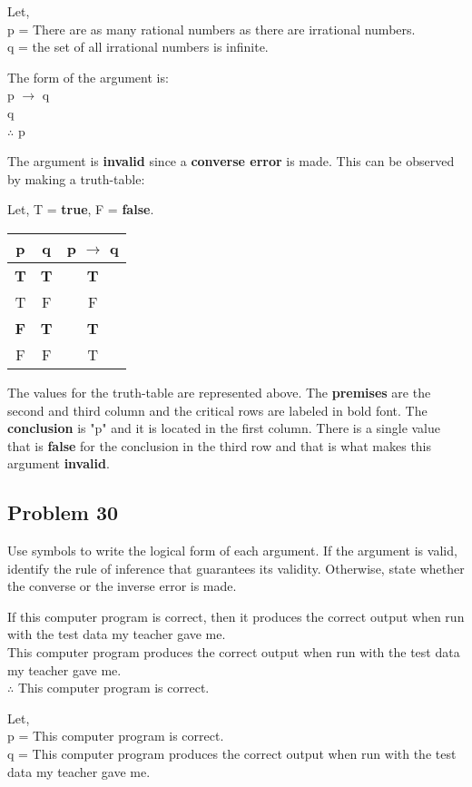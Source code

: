 \documentclass{article}
\begin{document}
Let, 
\\p = There are as many rational numbers as there are irrational numbers.
\\q = the set of all irrational numbers is infinite.

The form of the argument is:
\\ p $\rightarrow$ q
\\ q
\\ $\therefore$ p

The argument is \textbf{invalid} since a \textbf{converse error} is made. This can be observed by making a truth-table:

Let, T = \textbf{true}, F = \textbf{false}.
\begin{center}
	\begin{tabular}{ |c|c|c| } 
		\hline
		p & q & p $\rightarrow$ q \\ 
		\hline
		\textbf{T} & \textbf{T} & \textbf{T} \\ 
		T & F & F \\ 
		\textbf{F} & \textbf{T} & \textbf{T} \\ 
		F & F & T \\ 
		\hline
	\end{tabular}
\end{center}

The values for the truth-table are represented above. The \textbf{premises} are the second and third column and the critical rows are labeled in bold font. The \textbf{conclusion} is "p" and it is located in the first column. There is a single value that is \textbf{false} for the conclusion in the third row and that is what makes this argument \textbf{invalid}.

\subsection*{Problem 30}
Use symbols to write the logical form of each argument. If the argument is valid, identify the rule of inference that guarantees its validity. Otherwise, state whether the converse or the inverse error is made.

If this computer program is correct, then it produces the
correct output when run with the test data my teacher
gave me.
\\ This computer program produces the correct output
when run with the test data my teacher gave me.
\\ $\therefore$ This computer program is correct.

Let, 
\\p = This computer program is correct.
\\q = This computer program produces the correct output when run with the test data my teacher gave me.
\end{document}
